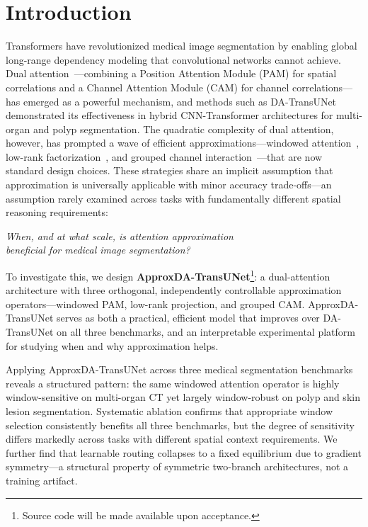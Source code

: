 \section{Introduction}

Transformers have revolutionized medical image segmentation by enabling global long-range dependency modeling that convolutional networks cannot achieve. Dual attention~\cite{fu2019dual}---combining a Position Attention Module (PAM) for spatial correlations and a Channel Attention Module (CAM) for channel correlations---has emerged as a powerful mechanism, and methods such as DA-TransUNet~\cite{sun2024datransunet} demonstrated its effectiveness in hybrid CNN-Transformer architectures for multi-organ and polyp segmentation. The quadratic complexity of dual attention, however, has prompted a wave of efficient approximations---windowed attention~\cite{liu2021swin}, low-rank factorization~\cite{wang2020linformer}, and grouped channel interaction~\cite{rahman2024emcad}---that are now standard design choices. These strategies share an implicit assumption that approximation is universally applicable with minor accuracy trade-offs---an assumption rarely examined across tasks with fundamentally different spatial reasoning requirements:

\begin{center}
\emph{When, and at what scale, is attention approximation\\
beneficial for medical image segmentation?}
\end{center}
To investigate this, we design \textbf{ApproxDA-TransUNet}\footnote{Source code will be made available upon acceptance.}: a dual-attention architecture with three orthogonal, independently controllable approximation operators---windowed PAM, low-rank projection, and grouped CAM. ApproxDA-TransUNet serves as both a practical, efficient model that improves over DA-TransUNet on all three benchmarks, and an interpretable experimental platform for studying when and why approximation helps.

Applying ApproxDA-TransUNet across three medical segmentation benchmarks reveals a structured pattern: the same windowed attention operator is highly window-sensitive on multi-organ CT yet largely window-robust on polyp and skin lesion segmentation. Systematic ablation confirms that appropriate window selection consistently benefits all three benchmarks, but the degree of sensitivity differs markedly across tasks with different spatial context requirements. We further find that learnable routing collapses to a fixed equilibrium due to gradient symmetry---a structural property of symmetric two-branch architectures, not a training artifact.

